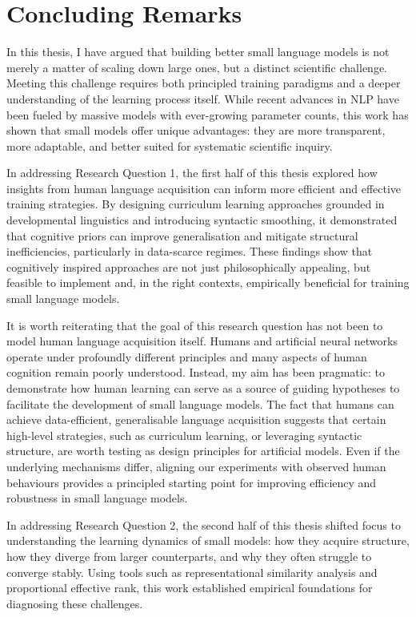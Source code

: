 \chapter{Concluding Remarks}
In this thesis, I have argued that building better small language models is not merely a matter of scaling down large ones, but a distinct scientific challenge. Meeting this challenge requires both principled training paradigms and a deeper understanding of the learning process itself. While recent advances in NLP have been fueled by massive models with ever-growing parameter counts, this work has shown that small models offer unique advantages: they are more transparent, more adaptable, and better suited for systematic scientific inquiry.

In addressing Research Question 1, the first half of this thesis explored how insights from human language acquisition can inform more efficient and effective training strategies. By designing curriculum learning approaches grounded in developmental linguistics and introducing syntactic smoothing, it demonstrated that cognitive priors can improve generalisation and mitigate structural inefficiencies, particularly in data-scarce regimes. These findings show that cognitively inspired approaches are not just philosophically appealing, but feasible to implement and, in the right contexts, empirically beneficial for training small language models.

It is worth reiterating that the goal of this research question has not been to model human language acquisition itself. Humans and artificial neural networks operate under profoundly different principles and many aspects of human cognition remain poorly understood. Instead, my aim has been pragmatic: to demonstrate how human learning can serve as a source of guiding hypotheses to facilitate the development of small language models. The fact that humans can achieve data-efficient, generalisable language acquisition suggests that certain high-level strategies, such as curriculum learning, or leveraging syntactic structure, are worth testing as design principles for artificial models. Even if the underlying mechanisms differ, aligning our experiments with observed human behaviours provides a principled starting point for improving efficiency and robustness in small language models.

In addressing Research Question 2, the second half of this thesis shifted focus to understanding the learning dynamics of small models: how they acquire structure, how they diverge from larger counterparts, and why they often struggle to converge stably. Using tools such as representational similarity analysis and proportional effective rank, this work established empirical foundations for diagnosing these challenges.

